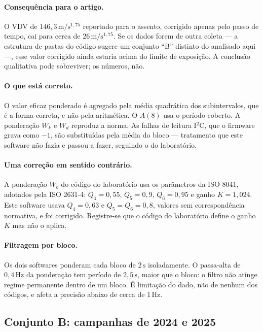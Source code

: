 \documentclass[11pt,a4paper]{article}
\newcommand{\unit}[2]{\ensuremath{#1\,\mathrm{#2}}}
\begin{document}
\paragraph{Consequência para o artigo.} O VDV de \unit{146{,}3}{m/s^{1{,}75}}
reportado para o assento, corrigido apenas pelo passo de tempo, cai para cerca
de \unit{26}{m/s^{1{,}75}}. Se os dados forem de outra coleta --- a estrutura de
pastas do código sugere um conjunto ``B'' distinto do analisado aqui ---, esse
valor corrigido ainda estaria acima do limite de exposição. A conclusão
qualitativa pode sobreviver; os números, não.

\paragraph{O que está correto.} O valor eficaz ponderado é agregado pela média
quadrática dos subintervalos, que é a forma correta, e não pela aritmética. O
$A(8)$ usa o período coberto. A ponderação $W_k$ e $W_d$ reproduz a norma. As
falhas de leitura I$^2$C, que o firmware grava como $-1$, são substituídas pela
média do bloco --- tratamento que este software não fazia e passou a fazer,
seguindo o do laboratório.

\paragraph{Uma correção em sentido contrário.} A ponderação $W_b$ do código do
laboratório usa os parâmetros da ISO 8041, adotados pela ISO 2631-4: $Q_4 = 0{,}55$,
$Q_5 = 0{,}9$, $Q_6 = 0{,}95$ e ganho $K = 1{,}024$. Este software usava
$Q_4 = 0{,}63$ e $Q_5 = Q_6 = 0{,}8$, valores sem correspondência normativa, e foi
corrigido. Registre-se que o código do laboratório define o ganho $K$ mas não o
aplica.

\paragraph{Filtragem por bloco.} Os dois softwares ponderam cada bloco de
\unit{2}{s} isoladamente. O passa-alta de \unit{0{,}4}{Hz} da ponderação tem
período de \unit{2{,}5}{s}, maior que o bloco: o filtro não atinge regime
permanente dentro de um bloco. É limitação do dado, não de nenhum dos códigos, e
afeta a precisão abaixo de cerca de \unit{1}{Hz}.

\subsection{Conjunto B: campanhas de 2024 e 2025}
\label{sec:conjuntoB}
\end{document}
